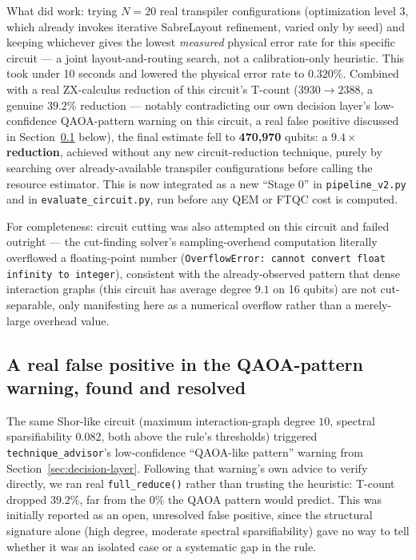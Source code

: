 \documentclass[9pt,twocolumn]{extarticle}
\begin{document}
What did work: trying $N=20$ real transpiler configurations (optimization
level 3, which already invokes iterative SabreLayout refinement, varied
only by seed) and keeping whichever gives the lowest \emph{measured}
physical error rate for this specific circuit --- a joint layout-and-routing
search, not a calibration-only heuristic. This took under 10 seconds and
lowered the physical error rate to $0.320\%$. Combined with a real
ZX-calculus reduction of this circuit's T-count ($3930\to2388$, a genuine
$39.2\%$ reduction --- notably contradicting our own decision layer's
low-confidence QAOA-pattern warning on this circuit, a real false positive
discussed in Section~\ref{sec:false-positive} below), the final estimate
fell to \textbf{470{,}970} qubits: a \textbf{$9.4\times$ reduction}, achieved
without any new circuit-reduction technique, purely by searching over
already-available transpiler configurations before calling the resource
estimator. This is now integrated as a new ``Stage 0'' in
\texttt{pipeline\_v2.py} and in \texttt{evaluate\_circuit.py}, run before
any QEM or FTQC cost is computed.

For completeness: circuit cutting was also attempted on this circuit and
failed outright --- the cut-finding solver's sampling-overhead computation
literally overflowed a floating-point number (\texttt{OverflowError:
cannot convert float infinity to integer}), consistent with the
already-observed pattern that dense interaction graphs (this circuit has
average degree $9.1$ on 16 qubits) are not cut-separable, only manifesting
here as a numerical overflow rather than a merely-large overhead value.

\subsection{A real false positive in the QAOA-pattern warning, found and resolved}
\label{sec:false-positive}
The same Shor-like circuit (maximum interaction-graph degree $10$,
spectral sparsifiability $0.082$, both above the rule's thresholds) triggered
\texttt{technique\_advisor}'s low-confidence ``QAOA-like pattern'' warning
from Section~\ref{sec:decision-layer}. Following that warning's own advice
to verify directly, we ran real \texttt{full\_reduce()} rather than trusting
the heuristic: T-count dropped $39.2\%$, far from the $0\%$ the QAOA
pattern would predict. This was initially reported as an open, unresolved
false positive, since the structural signature alone (high degree,
moderate spectral sparsifiability) gave no way to tell whether it was an
isolated case or a systematic gap in the rule.
\end{document}
